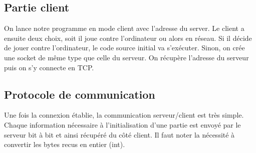 \documentclass{article}
\begin{document}
	\subsection{Partie client}
	On lance notre programme en mode client avec l'adresse du server.
	Le client a ensuite deux choix, soit il joue contre l'ordinateur ou alors en r\'eseau.
	Si il d\'ecide de jouer contre l'ordinateur, le code source initial va s'ex\'ecuter.
	Sinon, on cr\'ee une socket de m\^eme type que celle du serveur.
	On r\'ecup\`ere l'adresse du serveur puis on s'y connecte en TCP.

	\subsection{Protocole de communication}
	Une fois la connexion \'etablie, la communication serveur/client est tr\`es simple.
	Chaque information n\'ecessaire \`a l'initialisation d'une partie est envoy\'e par le serveur bit \`a bit et ainsi r\'ecup\'er\'e du c\^ot\'e client.
	Il faut noter la n\'ecessit\'e \`a convertir les bytes recus en entier (int).
\end{document}
